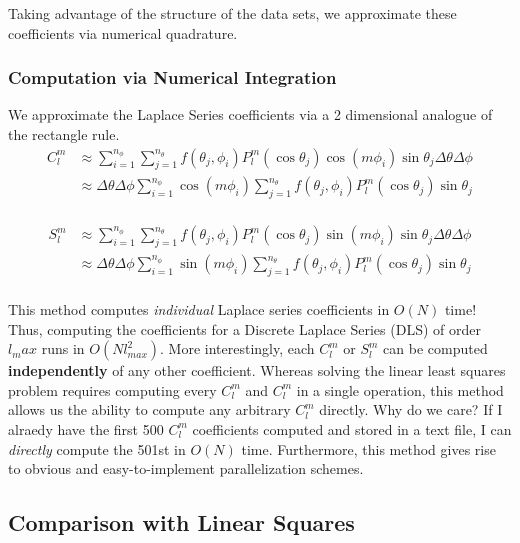 \documentclass[a4paper]{article}
\theoremstyle{definition}
\begin{document}
Taking advantage of the structure of the data sets, we approximate these coefficients via numerical quadrature.

\subsubsection{Computation via Numerical Integration}


    
We approximate the Laplace Series coefficients via a 2 dimensional analogue of the rectangle rule.  
\begin{align*}
    C_l^m &\approx \sum_{i = 1}^{n_\phi}\sum_{j = 1}^{n_\theta} f(\theta_j, \phi_i) P_l^m (\cos \theta_j)\cos (m \phi_i) \sin \theta_j \Delta\theta \Delta\phi\\
          &\approx \Delta\theta \Delta\phi\sum_{i = 1}^{n_\phi}\cos (m \phi_i)\sum_{j = 1}^{n_\theta} f(\theta_j, \phi_i) P_l^m (\cos \theta_j) \sin \theta_j\\
\end{align*}

\begin{align*}
    S_l^m &\approx \sum_{i = 1}^{n_\phi}\sum_{j = 1}^{n_\theta} f(\theta_j, \phi_i) P_l^m (\cos \theta_j)\sin (m \phi_i) \sin \theta_j \Delta\theta \Delta\phi\\
          &\approx \Delta\theta \Delta\phi\sum_{i = 1}^{n_\phi}\sin (m \phi_i)\sum_{j = 1}^{n_\theta} f(\theta_j, \phi_i) P_l^m (\cos \theta_j) \sin \theta_j\\
\end{align*}

This method computes \textit{individual} Laplace series coefficients in $O(N)$ time! Thus, computing the coefficients for a Discrete Laplace Series (DLS) of order $l_max$ runs in
$O(Nl^2_{max})$. More interestingly, each $C_l^m$ or $S_l^m$ can be computed \textbf{independently} of any other coefficient. Whereas solving the linear least squares problem requires computing
every $C_l^m$ and $C_l^m$ in a single operation, this method allows us the ability to compute any arbitrary $C_l^m$ directly. Why do we care? If I alraedy have the first 500 $C_l^m$ coefficients computed
and stored in a text file, I can \textit{directly} compute the 501st in $O(N)$ time. Furthermore, this method gives rise to obvious and easy-to-implement parallelization schemes.

\newpage
\subsection{Comparison with Linear Squares}
\end{document}
